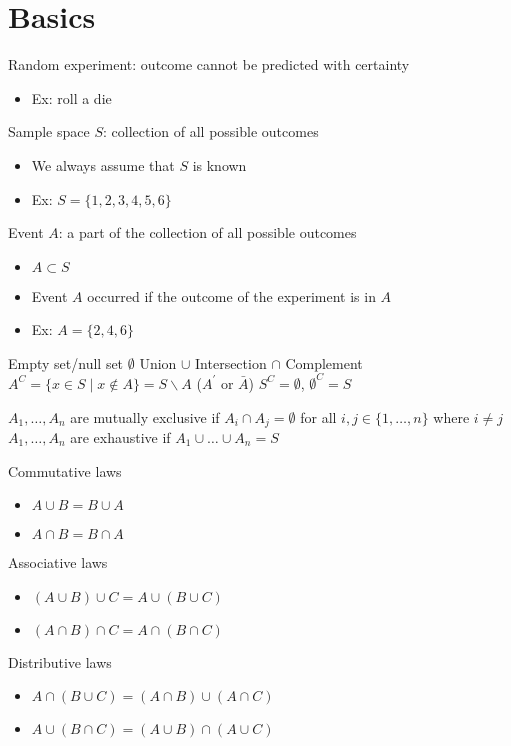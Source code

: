 \documentclass{article}
\begin{document}
\section{Basics}

Random experiment: outcome cannot be predicted with certainty
\begin{itemize}
    \item Ex: roll a die
\end{itemize}

Sample space $S$: collection of all possible outcomes
\begin{itemize}
    \item We always assume that $S$ is known
    \item Ex: $S=\{1,2,3,4,5,6\}$
\end{itemize}

Event $A$: a part of the collection of all possible outcomes
\begin{itemize}
    \item $A\subset S$
    \item Event $A$ occurred if the outcome of the experiment is in $A$
    \item Ex: $A=\{2,4,6\}$
\end{itemize}

Empty set/null set $\emptyset$
Union $\cup$
Intersection $\cap$
Complement $A^C=\{x\in S\mid x\notin A\}=S\backslash A$ ($A^\prime$ or $\bar{A}$)
$S^C=\emptyset$, $\emptyset^C=S$

$A_1,\dots,A_n$ are mutually exclusive if $A_i\cap A_j=\emptyset$ for all $i,j\in\{1,\dots,n\}$ where $i\neq j$
$A_1,\dots,A_n$ are exhaustive if $A_1\cup\dots\cup A_n=S$

Commutative laws
\begin{itemize}
    \item $A\cup B=B\cup A$
    \item $A\cap B=B\cap A$
\end{itemize}

Associative laws
\begin{itemize}
    \item $(A\cup B)\cup C=A\cup(B\cup C)$
    \item $(A\cap B)\cap C=A\cap(B\cap C)$
\end{itemize}

Distributive laws
\begin{itemize}
    \item $A\cap(B\cup C)=(A\cap B)\cup(A\cap C)$
    \item $A\cup(B\cap C)=(A\cup B)\cap(A\cup C)$
\end{itemize}
\end{document}
